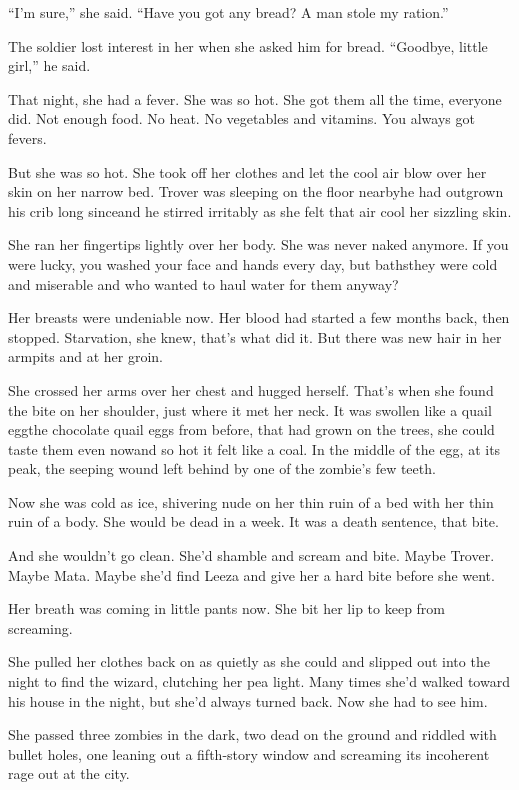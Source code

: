 “I’m sure,” she said. “Have you got any bread? A man stole my
ration.”

The soldier lost interest in her when she asked him for bread.
“Goodbye, little girl,” he said.

That night, she had a fever. She was so hot. She got them all the
time, everyone did. Not enough food. No heat. No vegetables and
vitamins. You always got fevers.

But she was so hot. She took off her clothes and let the cool air
blow over her skin on her narrow bed. Trover was sleeping on the
floor nearby\dash{}he had outgrown his crib long since\dash{}and he stirred
irritably as she felt that air cool her sizzling skin.

She ran her fingertips lightly over her body. She was never naked
anymore. If you were lucky, you washed your face and hands every
day, but baths\dash{}they were cold and miserable and who wanted to haul
water for them anyway?

Her breasts were undeniable now. Her blood had started a few months
back, then stopped. Starvation, she knew, that’s what did it. But
there was new hair in her armpits and at her groin.

She crossed her arms over her chest and hugged herself. That’s when
she found the bite on her shoulder, just where it met her neck. It
was swollen like a quail egg\dash{}the chocolate quail eggs from before,
that had grown on the trees, she could taste them even now\dash{}and so
hot it felt like a coal. In the middle of the egg, at its peak, the
seeping wound left behind by one of the zombie’s few teeth.

Now she was cold as ice, shivering nude on her thin ruin of a bed
with her thin ruin of a body. She would be dead in a week. It was a
death sentence, that bite.

And she wouldn’t go clean. She’d shamble and scream and bite. Maybe
Trover. Maybe Mata. Maybe she’d find Leeza and give her a hard bite
before she went.

Her breath was coming in little pants now. She bit her lip to keep
from screaming.

She pulled her clothes back on as quietly as she could and slipped
out into the night to find the wizard, clutching her pea light.
Many times she’d walked toward his house in the night, but she’d
always turned back. Now she had to see him.

She passed three zombies in the dark, two dead on the ground and
riddled with bullet holes, one leaning out a fifth-story window and
screaming its incoherent rage out at the city.

